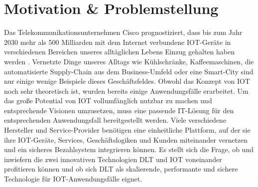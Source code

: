 \section{Motivation \& Problemstellung}
\label{sec:intro:motivation}
Das Telekommunikationsunternehmen Cisco prognostiziert, dass bis zum Jahr 2030 mehr als 500 Milliarden mit dem Internet verbundene \ac{IOT}-Geräte in verschiedenen Bereichen unseres alltäglichen Lebens Einzug gehalten haben werden \cite{cisco2016}. Vernetzte Dinge unseres Alltags wie Kühlschränke, Kaffeemaschinen, die automatisierte Supply-Chain aus dem Business-Umfeld oder eine Smart-City sind nur einige wenige Beispiele dieses Geschäftsfeldes. Obwohl das Konzept von \ac{IOT} noch sehr theoretisch ist, wurden bereits einige Anwendungsfälle erarbeitet. Um das große Potential von \ac{IOT} vollumfänglich nutzbar zu machen und entsprechende Visionen umzusetzen, muss eine passende IT-Lösung für den entsprechenden Anwendungsfall bereitgestellt werden. Viele verschiedene Hersteller und Service-Provider benötigen eine einheitliche Plattform, auf der sie ihre \ac{IOT}-Geräte, Services, Geschäftslogiken und Kunden miteinander vernetzen und ein sicheres Bezahlsystem integrieren können. Es stellt sich die Frage, ob und inwiefern die zwei innovativen Technologien \ac{DLT} und \ac{IOT} voneinander profitieren können und ob sich \ac{DLT} als skalierende, performante und sichere Technologie für \ac{IOT}-Anwendungsfälle eignet.

%
%

